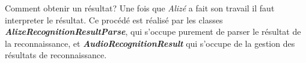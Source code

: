 Comment obtenir un résultat? Une fois que \textit{Alizé} a fait son travail il faut interpreter le résultat. Ce procédé est réalisé par les classes
\textbf{\textit{AlizeRecognitionResultParse}}, qui s'occupe purement de parser le résultat de la reconnaissance, et \textbf{\textit{AudioRecognitionResult}}
qui s'occupe de la gestion des résultats de reconnaissance.



